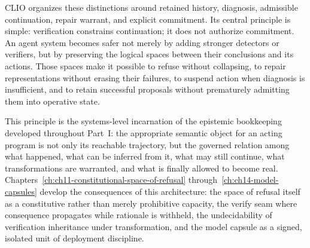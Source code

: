 CLIO organizes these distinctions around retained history, diagnosis, admissible continuation, repair warrant, and explicit commitment. Its central principle is simple: verification constrains continuation; it does not authorize commitment. An agent system becomes safer not merely by adding stronger detectors or verifiers, but by preserving the logical spaces between their conclusions and its actions. Those spaces make it possible to refuse without collapsing, to repair representations without erasing their failures, to suspend action when diagnosis is insufficient, and to retain successful proposals without prematurely admitting them into operative state.

This principle is the systems-level incarnation of the epistemic bookkeeping developed throughout Part~I: the appropriate semantic object for an acting program is not only its reachable trajectory, but the governed relation among what happened, what can be inferred from it, what may still continue, what transformations are warranted, and what is finally allowed to become real. Chapters~\ref{ch:ch11-constitutional-space-of-refusal} through~\ref{ch:ch14-model-capsules} develop the consequences of this architecture: the space of refusal itself as a constitutive rather than merely prohibitive capacity, the verify seam where consequence propagates while rationale is withheld, the undecidability of verification inheritance under transformation, and the model capsule as a signed, isolated unit of deployment discipline.
